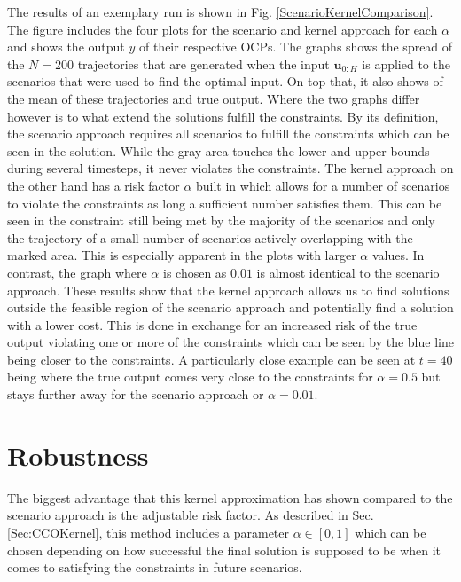 The results of an exemplary run is shown in Fig. \ref{ScenarioKernelComparison}. The figure includes the four plots for the scenario and kernel approach for each $\alpha$ and shows the output $y$ of their respective OCPs. The graphs shows the spread of the $N = 200$ trajectories that are generated when the input $\boldsymbol{u}_{0:H}$ is applied to the scenarios that were used to find the optimal input. On top that, it also shows of the mean of these trajectories and true output. Where the two graphs differ however is to what extend the solutions fulfill the constraints. By its definition, the scenario approach requires all scenarios to fulfill the constraints which can be seen in the solution. While the gray area touches the lower and upper bounds during several timesteps, it never violates the constraints. The kernel approach on the other hand has a risk factor $\alpha$ built in which allows for a number of scenarios to violate the constraints as long a sufficient number satisfies them. This can be seen in the constraint still being met by the majority of the scenarios and only the trajectory of a small number of scenarios actively overlapping with the marked area. This is especially apparent in the plots with larger $\alpha$ values. In contrast, the graph where $\alpha$ is chosen as $0.01$ is almost identical to the scenario approach. These results show that the kernel approach allows us to find solutions outside the feasible region of the scenario approach and potentially find a solution with a lower cost. This is done in exchange for an increased risk of the true output violating one or more of the constraints which can be seen by the blue line being closer to the constraints. A particularly close example can be seen at $t = 40$ being where the true output comes very close to the constraints for $\alpha = 0.5$ but stays further away for the scenario approach or $\alpha = 0.01$.




\section{Robustness} \label{performance guarantees}

The biggest advantage that this kernel approximation has shown compared to the scenario approach is the adjustable risk factor. As described in Sec. \ref{Sec:CCOKernel}, this method includes a parameter $\alpha \in [0, 1]$ which can be chosen depending on how successful the final solution is supposed to be when it comes to satisfying the constraints in future scenarios. 

